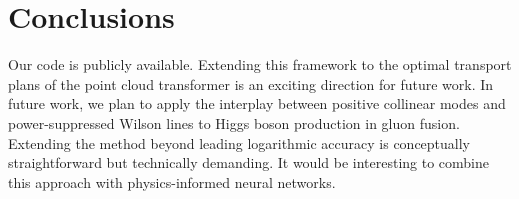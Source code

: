 \section{Conclusions}\label{sec:conclusions}

Our code is publicly available. Extending this framework to the optimal
transport plans of the point cloud transformer is an exciting direction
for future work. In future work, we plan to apply the interplay between
positive collinear modes and power-suppressed Wilson lines to Higgs
boson production in gluon fusion. Extending the method beyond leading
logarithmic accuracy is conceptually straightforward but technically
demanding. It would be interesting to combine this approach with
physics-informed neural networks.

